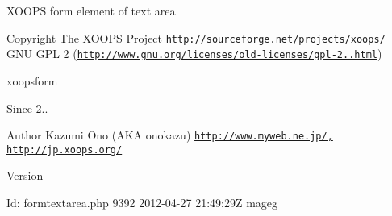 X\-O\-O\-P\-S form element of text area

\begin{DoxyCopyright}{Copyright}
The X\-O\-O\-P\-S Project \href{http://sourceforge.net/projects/xoops/}{\tt http\-://sourceforge.\-net/projects/xoops/}  G\-N\-U G\-P\-L 2 (\href{http://www.gnu.org/licenses/old-licenses/gpl-2.0.html}{\tt http\-://www.\-gnu.\-org/licenses/old-\/licenses/gpl-\/2..\-html})
\end{DoxyCopyright}
xoopsform \begin{DoxySince}{Since}
2.. 
\end{DoxySince}
\begin{DoxyAuthor}{Author}
Kazumi Ono (A\-K\-A onokazu) \href{http://www.myweb.ne.jp/,}{\tt http\-://www.\-myweb.\-ne.\-jp/,} \href{http://jp.xoops.org/}{\tt http\-://jp.\-xoops.\-org/} 
\end{DoxyAuthor}
\begin{DoxyVersion}{Version}

\end{DoxyVersion}
\begin{DoxyParagraph}{Id\-:}
formtextarea.\-php 9392 2012-\/04-\/27 21\-:49\-:29\-Z mageg 
\end{DoxyParagraph}

